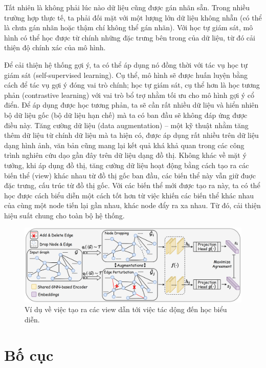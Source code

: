 Tất nhiên là không phải lúc nào dữ liệu cũng được gán nhãn sẵn. Trong nhiều trường hợp thực tế, ta phải đối mặt với một lượng lớn dữ liệu không nhẵn (có thể là chưa gán nhãn hoặc thậm chí không thể gán nhãn). Với học tự giám sát, mô hình có thể học được từ chính những đặc trưng bên trong của dữ liệu, từ đó cải thiện độ chính xác của mô hình. 

Để cải thiện hệ thống gợi ý, ta có thể áp dụng nó đồng thời với tác vụ học tự giám sát (self-supervised learning). Cụ thể, mô hình sẽ được huấn luyện bằng cách để tác vụ gợi ý đóng vai trò chính; học tự giám sát, cụ thể hơn là học tương phản (contrastive learning) với vai trò bổ trợ nhằm tối ưu cho mô hình gợi ý cổ điển. Để áp dụng được học tương phản, ta sẽ cần rất nhiều dữ liệu và hiển nhiên bộ dữ liệu gốc (bộ dữ liệu hạn chế) mà ta có ban đầu sẽ không đáp ứng được điều này. Tăng cường dữ liệu (data augmentation) -- một kỹ thuật nhằm tăng thêm dữ liệu từ chính dữ liệu mà ta hiện có, được áp dụng rất nhiều trên dữ liệu dạng hình ảnh, văn bản cũng mang lại kết quả khá khả quan trong các công trình nghiên cứu dạo gần đây trên dữ liệu dạng đồ thị. Không khác về mặt ý tưởng, khi áp dụng đồ thị, tăng cường dữ liệu hoạt động bằng cách tạo ra các biến thể (view) khác nhau từ đồ thị gốc ban đầu, các biến thể này vẫn giữ đuợc đặc trưng, cấu trúc từ đồ thị gốc. Với các biến thể mới được tạo ra này, ta có thể học được cách biểu diễn một cách tốt hơn từ việc khiến các biến thể khác nhau của cùng một node tiến lại gần nhau, khác node đẩy ra xa nhau. Từ đó, cải thiện hiệu suất chung cho toàn bộ hệ thống.

\begin{figure}[H]
    \centering
    \includegraphics[scale=0.31]{images/Chapter1/graph-contrastive-learning.png}
    \caption{Ví dụ về việc tạo ra các view dẫn tới việc tác dộng đến học biểu diễn.}
\end{figure}

\section{Bố cục}

